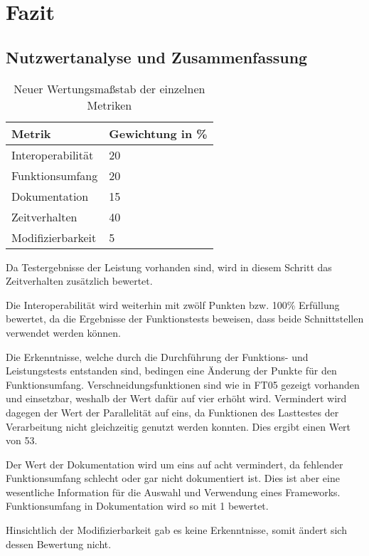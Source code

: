 \chapter{Fazit}
\section{Nutzwertanalyse und Zusammenfassung}

\begin{table}[h!]
\centering
\begin{tabular}{l|l}
\textbf{Metrik} & \textbf{Gewichtung in \%} \\ \hline
Interoperabilität & 20 \\ \hline
Funktionsumfang & 20 \\ \hline
Dokumentation & 15 \\ \hline
Zeitverhalten & 40 \\ \hline
Modifizierbarkeit & 5
\end{tabular}
\caption{Neuer Wertungsmaßstab der einzelnen Metriken}
\label{table:Wertungsmassstab2}
\end{table}
Da Testergebnisse der Leistung vorhanden sind, wird in diesem Schritt das Zeitverhalten zusätzlich bewertet.

Die Interoperabilität wird weiterhin mit zwölf Punkten bzw. 100\%{} Erfüllung bewertet, da die Ergebnisse der Funktionstests beweisen, dass beide Schnittstellen verwendet werden können.

Die Erkenntnisse, welche durch die Durchführung der Funktions- und Leistungstests entstanden sind, bedingen eine Änderung der Punkte für den Funktionsumfang.
Verschneidungsfunktionen sind wie in FT05 gezeigt vorhanden und einsetzbar, weshalb der Wert dafür auf vier erhöht wird.
Vermindert wird dagegen der Wert der Parallelität auf eins, da Funktionen des Lasttestes der Verarbeitung nicht gleichzeitig genutzt werden konnten.
Dies ergibt einen Wert von 53.

Der Wert der Dokumentation wird um eins auf acht vermindert, da fehlender Funktionsumfang schlecht oder gar nicht dokumentiert ist.
Dies ist aber eine wesentliche Information für die Auswahl und Verwendung eines Frameworks.
Funktionsumfang in Dokumentation wird so mit 1 bewertet.

Hinsichtlich der Modifizierbarkeit gab es keine Erkenntnisse, somit ändert sich dessen Bewertung nicht.

